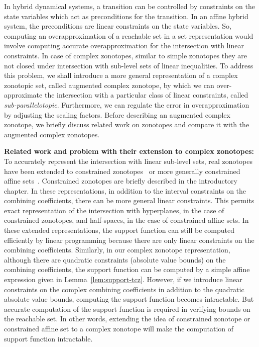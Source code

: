 In hybrid dynamical systems, a transition can be controlled by
constraints on the state variables which act as preconditions for the
transition.  In an affine hybrid system, the preconditions are linear
constraints on the state variables.  So, computing an
overapproximation of a reachable set in a set representation would
involve computing accurate overapproximation for the intersection with
linear constraints.  In case of complex zonotopes, similar to simple
zonotopes they are not closed under intersection with sub-level sets
of linear inequalities.  To address this problem, we shall introduce a
more general representation of a complex zonotopic set, called
augmented complex zonotope, by which we can over-approximate the
intersection with a particular class of linear constraints, called
\emph{sub-parallelotopic}.  Furthermore, we can regulate the error in
overapproximation by adjusting the scaling factors.  Before describing
an augmented complex zonotope, we briefly discuss related work on
zonotopes and compare it with the augmented complex zonotopes.  

{\bf Related work and problem with their extension to complex
zonotopes: } To accurately represent the intersection with linear
sub-level sets, real zonotopes have been extended to constrained
zonotopes~\cite{scott2016constrained} or more generally constrained
affine sets~\cite{Ghorbal2010}.  Constrained zonotopes are briefly
described in the introductory chapter.  In these representations, in
addition to the interval constraints on the combining coefficients,
there can be more general linear constraints.  This permits exact
representation of the intersection with hyperplanes, in the case of
constrained zonotopes, and half-spaces, in the case of constrained
affine sets.  In these extended representations, the support function
can still be computed efficiently by linear programming because there are
only linear constraints on the combining coefficients.  Similarly, in
our complex zonotope representation, although there are quadratic
constraints (absolute value bounds) on the combining coefficients, the
support function can be computed by a simple affine expression given
in Lemma~\ref{lem:support-tcz}.  However, if we introduce linear
constraints on the complex combining coefficients in addition to the
quadratic absolute value bounds, computing the support function
becomes intractable.  But accurate computation of the support function
is required in verifying bounds on the reachable set.  In other words,
extending the idea of constrained zonotope or constrained affine set
to a complex zonotope will make the computation of support function
intractable.

